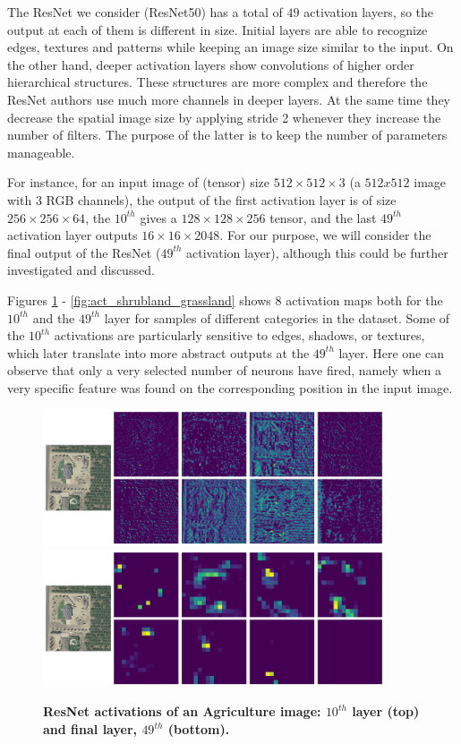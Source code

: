 The ResNet we consider (ResNet50) has a total of $49$ activation layers, so the output at each of them is different in size. Initial layers are able to recognize edges, textures and patterns while keeping an image size similar to the input. On the other hand, deeper activation layers show convolutions of higher order hierarchical structures. These structures are more complex and therefore the ResNet authors use much more channels in deeper layers. At the same time they decrease the spatial image size by applying stride 2 whenever they increase the number of filters. The purpose of the latter is to keep the number of parameters manageable.  

For instance, for an input image of (tensor) size $512 \times 512 \times 3$ (a $512x512$ image with $3$ RGB channels), the output of the first activation layer is of size $256 \times 256 \times 64$, the $10^{th}$ gives a $128 \times 128 \times 256$ tensor, and the last $49^{th}$ activation layer outputs $16 \times 16 \times 2048$. For our purpose, we will consider the final output of the ResNet ($49^{th}$ activation layer), although this could be further investigated and discussed.

Figures \ref{fig:act_agriculture} - \ref{fig:act_shrubland_grassland} shows 8 activation maps both for the $10^{th}$ and the $49^{th}$ layer for samples of different categories in the dataset. Some of the $10^{th}$ activations are particularly sensitive to edges, shadows, or textures, which later translate into more abstract outputs at the $49^{th}$ layer. Here one can observe that only a very selected number of neurons have fired, namely when a very specific feature was found on the corresponding position in the input image.

\begin{figure}[H]
	\centering
	\includegraphics[width=0.9\textwidth]{Figures/activations/agriculture_l2_s1_activation_10.png}
	\includegraphics[width=0.9\textwidth]{Figures/activations/agriculture_l2_s1_activation_49.png}
	\captionsetup{width=1\linewidth}
	\caption{\textbf{ResNet activations of an Agriculture image: $10^{th}$ layer (top) and final layer, $49^{th}$ (bottom).}}
	\label{fig:act_agriculture}
\end{figure}

